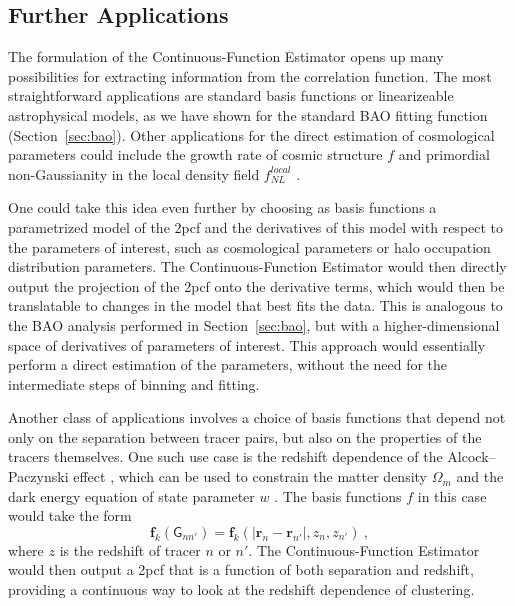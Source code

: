 \documentclass[modern]{aastex62}
\newcommand{\cf}{2pcf\xspace} %
\newcommand{\Est}{The Continuous-Function Estimator\xspace}
\newcommand{\est}{the Continuous-Function Estimator\xspace}
\newcommand{\bld}[1]{\bm{#1}} %
\newcommand{\ff}{\bld{f}}
\newcommand{\GG}[1]{\mathsf{G}_{#1}}
\begin{document}
\subsection{Further Applications}
\label{sec:applications}

The formulation of \est opens up many possibilities for extracting information from the correlation function.
The most straightforward applications are standard basis functions or linearizeable astrophysical models, as we have shown for the standard BAO fitting function (Section~\ref{sec:bao}).
Other applications for the direct estimation of cosmological parameters could include the growth rate of cosmic structure $f$ \citep{Satpathy2016, Reid2018} and primordial non-Gaussianity in the local density field $f^{local}_{NL}$ \citep{Karagiannis2014}.

One could take this idea even further by choosing as basis functions a parametrized model of the \cf and the derivatives of this model with respect to the parameters of interest, such as cosmological parameters or halo occupation distribution parameters.
\Est would then directly output the projection of the \cf onto the derivative terms, which would then be translatable to changes in the  model that best fits the data.
This is analogous to the BAO analysis performed in Section~\ref{sec:bao}, but with a higher-dimensional space of derivatives of parameters of interest.
This approach would essentially perform a direct estimation of the parameters, without the need for the intermediate steps of binning and fitting.

Another class of applications involves a choice of basis functions that depend not only on the separation between tracer pairs, but also on the properties of the tracers themselves.
One such use case is the redshift dependence of the Alcock--Paczynski effect \citep{AlcockPaczynski1979}, which can be used to constrain the matter density $\Omega_m$ and the dark energy equation of state parameter $w$ \citep{Li2016}.
The basis functions $f$ in this case would take the form
\begin{equation}
    \label{eq:ff_redshift}
    \ff_k(\GG{n n'}) = \ff_k(|\bld{r}_n - \bld{r}_{n'}|, z_n, z_{n'}) ~,
\end{equation}
where $z$ is the redshift of tracer $n$ or $n'$.
\Est would then output a \cf that is a function of both separation and redshift, providing a continuous way to look at the redshift dependence of clustering.
\end{document}
